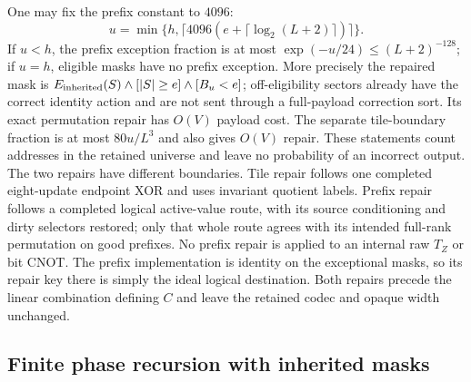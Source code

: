 One may fix the prefix constant to $4096$:
\[
 u=\min\{h,\lceil4096(e+\lceil\log_2(L+2)\rceil)\rceil\}.
\]
If $u<h$, the prefix exception fraction is at most
$\exp(-u/24)\le(L+2)^{-128}$; if $u=h$, eligible masks have no
prefix exception. More precisely the repaired mask is
$E_{\rm inherited}(S)\wedge[|S|\ge e]\wedge[B_u<e]$;
off-eligibility sectors already have the correct identity action and
are not sent through a full-payload correction sort. Its exact
permutation repair has $O(V)$ payload
cost. The separate tile-boundary fraction is at most $80u/L^3$ and
also gives $O(V)$ repair. These statements count addresses in the
retained universe and leave no probability of an incorrect output.
The two repairs have different boundaries. Tile repair follows one
completed eight-update endpoint XOR and uses invariant quotient
labels. Prefix repair follows a completed logical active-value route,
with its source conditioning and dirty selectors restored; only that
whole route agrees with its intended full-rank permutation on good
prefixes. No prefix repair is applied to an internal raw $T_Z$ or bit
CNOT. The prefix implementation is identity on the exceptional masks,
so its repair key there is simply the ideal logical destination.
Both repairs precede the linear combination defining $C$ and leave
the retained codec and opaque width unchanged.

\subsection{Finite phase recursion with inherited masks}

